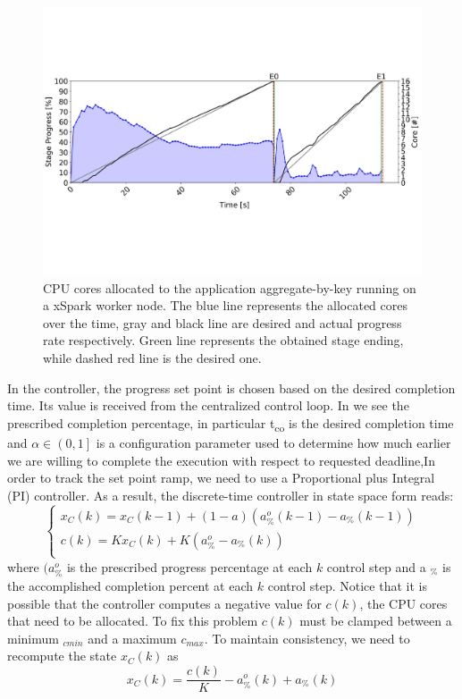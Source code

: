 \begin{figure}
	\vspace{-1cm}
	\centering
	\includegraphics[width=\columnwidth]{Images/xspark_chart_agg_by_key.pdf}  
\vspace{-2.5cm}
	\caption[xSpark chart aggrregate-by-key.]{CPU cores allocated to the application aggregate-by-key running on a xSpark worker node. The blue line represents the allocated cores over the time, gray and black line are desired and actual progress rate respectively. Green line represents the obtained stage ending, while dashed red line is the desired one.}
	\label{fig:xsparkChartAggByKey}
\end{figure}

In the controller, the progress set point is chosen based on the desired completion time. Its value is received from the centralized control loop. In  we see the prescribed completion percentage, in particular t\textsubscript{co} is the desired completion time and  $\alpha \in \left(0,1\right]$ is a configuration parameter used to determine how much earlier we are willing to complete the execution with respect to requested deadline,In order to track the set point ramp, we need to use a Proportional plus Integral (PI) controller.
As a result, the discrete-time controller in state space form reads:
\[\begin{cases}
x_{C}(k) = x_{C}(k - 1) + (1 - a)(a _{\%}^{o}(k - 1) - a _{\%}(k - 1))\\
c(k) = Kx_{C}(k) + K(a _{\%}^{o} - a _{\%}(k))\\
\end{cases}\]
where $(a _{\%}^{o}$ is the prescribed progress percentage at each $k$ control
step and a $_{\%}$ is the accomplished completion percent at each $k$ control
step. Notice that it is possible that the controller computes a negative value for $c(k)$, the CPU cores that need to be allocated. To fix this problem $c(k)$ must be clamped between a minimum $_{cmin}$ and a maximum $c_{max}$. To maintain consistency, we need to recompute the state $x_{C}(k)$ as 
\[x_{C}(k) = \dfrac{c(k)}{K} - a _{\%}^{o}(k) + a _{\%}(k)\] 


